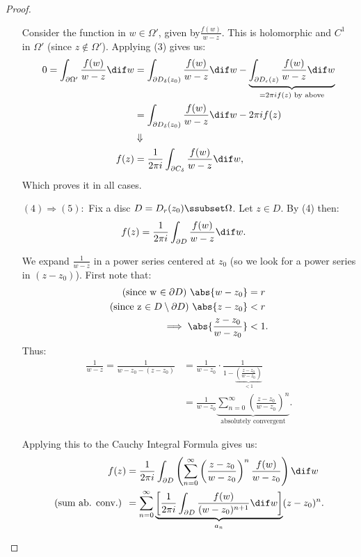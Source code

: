 \begin{proof}
\begin{enumerate}
\begin{center}
    \end{center}
    
    Consider the function in $w\in\Omega'$, given by$\frac{f(w)}{w-z}$. This is holomorphic and $C^1$ in $\Omega'$ (since $z \notin \Omega'$). Applying (3) gives us:
    \begin{align*}
        0 = \int_{\partial \Omega'} \frac{f(w)}{w-z}  \dif w &= \int_{\partial D_\delta (z_0)} \frac{f(w)}{w-z}  \dif w - \underbrace{\int_{\partial D_\epsilon (z)} \frac{f(w)}{w-z}  \dif w}_{=2\pi i f(z) \text{ by above}}\\
        &= \int_{\partial D_\delta (z_0)} \frac{f(w)}{w-z}  \dif w - 2\pi i f(z)\\
        &\Downarrow\\
        f(z) &= \frac{1}{2\pi i}\int_{\partial C_\delta} \frac{f(w)}{w-z} \dif w,
    \end{align*}
    Which proves it in all cases.
    
    
\item[$(4) \Rightarrow (5):$] Fix a disc $D= D_r(z_0) \ssubset \Omega$. Let $z\in D$. By (4) then:
\begin{align*}
    f(z) &= \frac{1}{2\pi i} \int_{\partial D} \frac{f(w)}{w-z}  \dif w.
\end{align*}
    
We expand $\frac{1}{w-z}$ in a power series centered at $z_0$ (so we look for a power series in $(z-z_0)$). First note that:
\begin{align*}
    \text{(since w $\in \partial D$)  } \abs{w-z_0} &= r\\
    \text{(since z $\in D \setminus \partial D$)  } \abs{z-z_0} &< r\\
    \implies \abs{\frac{z-z_0}{w-z_0}} &< 1.
\end{align*}
Thus:
\begin{align*} 
    \frac{1}{w-z} = \frac{1}{w-z_0-(z-z_0)} &= \frac{1}{w-z_0} \cdot \frac{1}{1-   \underbrace{ \left( \frac{z-z_0}{w-z_0} \right)   }_{<1}}\\
    &= \frac{1}{w-z_0} \underbrace{ \sum_{n=0}^\infty \left( \frac{z-z_0}{w-z_0} \right)^n }_{\text{absolutely convergent}}.
\end{align*}
    
Applying this to the Cauchy Integral Formula gives us:
\begin{align*}
     f(z) &= \frac{1}{2\pi i} \int_{\partial D} \left( \sum_{n=0}^\infty \left( \frac{z-z_0}{w-z_0} \right)^n \frac{f(w)}{w-z_0} \right) \dif w\\
     \text{(sum ab. conv.) } &= \sum_{n=0}^\infty \underbrace{ \left[  \frac{1}{2\pi i} \int_{\partial D}  \frac{f(w)}{(w-z_0)^{n+1}} \dif w  \right] }_{a_n} (z-z_0)^n.
\end{align*}
    

\end{enumerate}
\end{proof}
